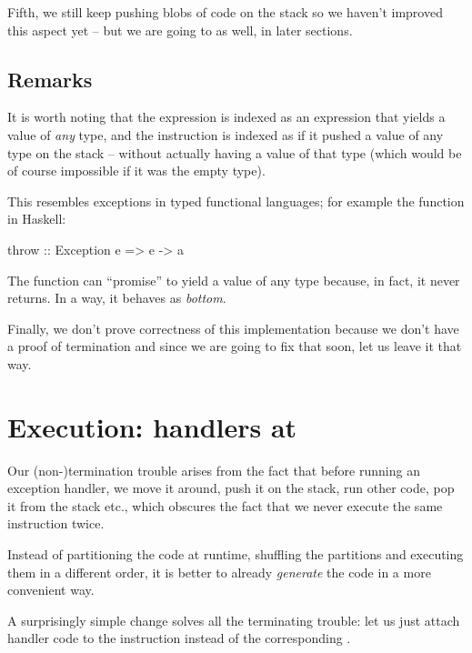 
Fifth, we still keep pushing blobs of code on the stack so we haven't improved
this aspect yet -- but we are going to as well, in later sections.


\subsection{Remarks}

It is worth noting that the expression  is indexed as an expression
that yields a value of \emph{any} type, and the instruction  is indexed
as if it pushed a value of any type on the stack -- without actually having a value
of that type (which would be of course impossible if it was the empty type).

This resembles exceptions in typed functional languages; for example the function
 in Haskell:
\begin{code}
  throw :: Exception e => e -> a
\end{code}
The function  can ``promise'' to yield a value of any type because,
in fact, it never returns. In a way, it behaves as \emph{bottom}.

Finally, we don't prove correctness of this implementation because we don't
have a proof of termination and since we are going to fix that soon, let us
leave it that way.

\section{Execution: handlers at }
\label{sec:handlers-at-unmark}

Our (non-)termination trouble arises from the fact that before running an
exception handler, we move it around, push it on the stack, run other code, pop
it from the stack etc., which obscures the fact that we never execute the same
instruction twice.

Instead of partitioning the code at runtime, shuffling the partitions and
executing them in a different order, it is better to already \emph{generate}
the code in a more convenient way.

A surprisingly simple change solves all the terminating trouble: let us just
attach handler code to the instruction  instead of the
corresponding .

